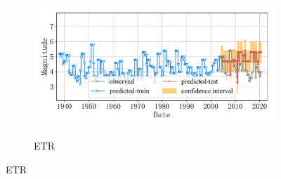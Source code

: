 \begin{figure}[!htbp]
\begin{subfigure}[b]{0.45\textwidth}
    \vspace{-1cm}
    \label{fig:seism_knn_minyear_1932_maxyear_2021_spanlat_2_spanlon_4_timewindow_72_nextmonth_12_minmag_3.0_block_6}
  \end{subfigure}
  ~
  \begin{subfigure}[b]{0.45\textwidth}
    \caption{ETR}
    \vspace{-0.2cm}
    \includegraphics[width=\textwidth]{Img/chap5_seism/block6/seism_etr_minyear_1932_maxyear_2021_spanlat_2_spanlon_4_timewindow_72_nextmonth_12_minmag_3.0_block_6.pdf}
    \vspace{-1cm}
    \label{fig:seism_etr_minyear_1932_maxyear_2021_spanlat_2_spanlon_4_timewindow_72_nextmonth_12_minmag_3.0_block_6}
  \end{subfigure}
  \label{fig:seism_minyear_1932_maxyear_2021_spanlat_2_spanlon_4_timewindow_72_nextmonth_12_minmag_3.0_block_6}
\end{figure}